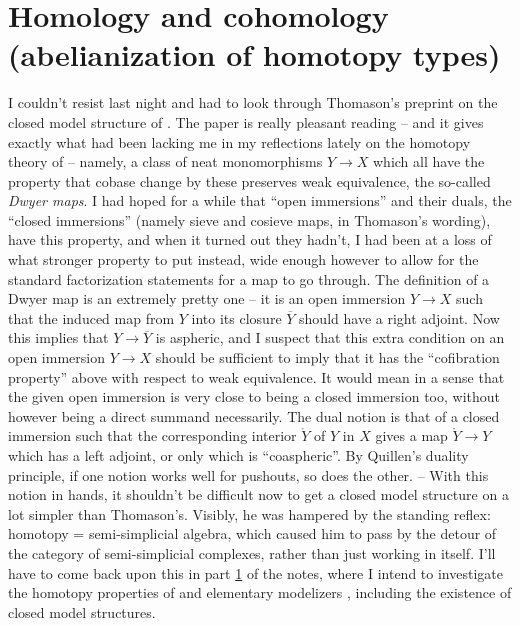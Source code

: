 
\chapter{Homology and cohomology (abelianization of homotopy types)}
\label{ch:V}

\presectionfill{}\par

\label{sec:87}%
I couldn't resist last night and had to look through Thomason's
preprint on the closed model structure of
\Cat. The paper is really pleasant
reading -- and it gives exactly what had been lacking me in my
reflections lately on the homotopy theory of \Cat{} -- namely, a class
of neat monomorphisms $Y\to X$ which all have the property that cobase
change by these preserves weak equivalence, the so-called \emph{Dwyer
  maps}. I
had hoped for a while that ``open immersions'' and their duals, the
``closed immersions'' (namely sieve and cosieve maps, in Thomason's
wording), have this property, and when it turned out they hadn't, I
had been at a loss of what stronger property to put instead, wide
enough however to allow for the standard factorization statements for
a map to go through. The definition of a Dwyer map is an extremely
pretty one -- it is an open immersion $Y\to X$ such that the induced
map from $Y$ into its closure $\overline Y$ should have a right
adjoint. Now this implies that $Y\to\overline Y$ is aspheric, and I
suspect that this extra condition on an open immersion $Y\to X$ should
be sufficient to imply that it has the ``cofibration property'' above
with respect to weak equivalence. It would mean in a sense that the
given open immersion is very close to being a closed immersion too,
without however being a direct summand necessarily. The dual notion is
that of a closed immersion such that the corresponding interior
$\mathring Y$ of $Y$ in $X$ gives a map $\mathring Y \to Y$ which has
a left adjoint, or only which is ``coaspheric''. By Quillen's duality
principle, if one notion works well for pushouts, so does the
other. -- With this notion in hands, it shouldn't be difficult now to
get a closed model structure on \Cat{} a lot simpler than
Thomason's. Visibly, he was hampered by the standing reflex: homotopy
= semi-simplicial algebra, which caused him to pass by the detour of
the category \Simplexhat{} of semi-simplicial complexes, rather than
just working in \Cat{} itself. I'll have to come back upon this in
part \ref{ch:V} of the notes, where I intend to investigate the
homotopy properties of \Cat{} and elementary modelizers \Ahat,
including the existence of closed model structures.

